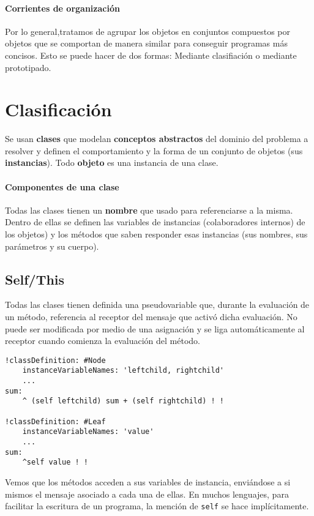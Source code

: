\paragraph{Corrientes de organización}
Por lo general,tratamos de agrupar los objetos en conjuntos compuestos por objetos que se comportan de manera similar para conseguir programas más concisos. Esto se puede hacer de dos formas: Mediante clasifiación o mediante prototipado.

\section{Clasificación}
Se usan \textbf{clases} que modelan \textbf{conceptos abstractos} del dominio del problema a resolver y definen el comportamiento y la forma de un conjunto de objetos (sus \textbf{instancias}). Todo \textbf{objeto} es una instancia de una clase.

\paragraph{Componentes de una clase}
Todas las clases tienen un \textbf{nombre} que usado para referenciarse a la misma. Dentro de ellas se definen las variables de instancias (colaboradores internos) de los objetos) y los métodos que saben responder esas instancias (sus nombres, sus parámetros y su cuerpo).

\subsection{Self/This}
Todas las clases tienen definida una pseudovariable que, durante la evaluación de un método, referencia al receptor del mensaje que activó dicha evaluación. No puede ser modificada por medio de una asignación y se liga automáticamente al receptor cuando comienza la evaluación del método.

\begin{verbatim}
!classDefinition: #Node 
	instanceVariableNames: 'leftchild, rightchild'
	...
sum: 
	^ (self leftchild) sum + (self rightchild) ! !
	
!classDefinition: #Leaf 
	instanceVariableNames: 'value'
	...
sum: 
	^self value ! !

\end{verbatim}

Vemos que los métodos acceden a sus variables de instancia, enviándose a si mismos el mensaje asociado a cada una de ellas. En muchos lenguajes, para facilitar la escritura de un programa, la mención de \texttt{self} se hace implícitamente.

